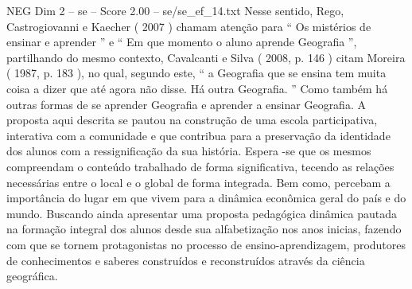 \begin{textsample}{NEG Dim 2 – se – Score 2.00 – se/se\_ef\_14.txt}
Nesse sentido, Rego, Castrogiovanni e Kaecher ( 2007 ) chamam atenção para “ Os mistérios de ensinar e aprender ” e “ Em que momento o aluno aprende Geografia ”, partilhando do mesmo contexto, Cavalcanti e Silva ( 2008, p. 146 ) citam Moreira ( 1987, p. 183 ), no qual, segundo este, “ a Geografia que se ensina tem muita coisa a dizer que até agora não disse.
Há outra Geografia. ” Como também há outras formas de se aprender Geografia e aprender a ensinar Geografia.
A proposta aqui descrita se pautou na construção de uma escola participativa, interativa com a comunidade e que contribua para a preservação da identidade dos alunos com a ressignificação da sua história.
Espera -se que os mesmos compreendam o conteúdo trabalhado de forma significativa, tecendo as relações necessárias entre o local e o global de forma integrada.
Bem como, percebam a importância do lugar em que vivem para a dinâmica econômica geral do país e do mundo.
Buscando ainda apresentar uma proposta pedagógica dinâmica pautada na formação integral dos alunos desde sua alfabetização nos anos inicias, fazendo com que se tornem protagonistas no processo de ensino-aprendizagem, produtores de conhecimentos e saberes construídos e reconstruídos através da ciência geográfica.

\end{textsample}
